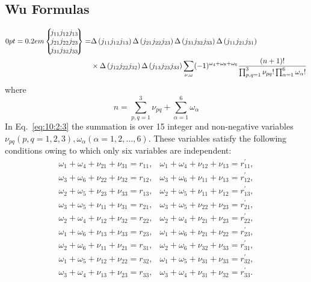 \subsection{Wu Formulas \cite{ref111}}\label{sec:10.2.2}
\begin{align}
\ninej{j_{11}}{j_{12}}{j_{13}}{j_{21}}{j_{22}}{j_{23}}{j_{31}}{j_{32}}{j_{33}}=&\Delta\left(j_{11} j_{12} j_{13}\right) \Delta\left(j_{21} j_{22} j_{23}\right) \Delta\left(j_{31} j_{32} j_{33}\right) \Delta\left(j_{11} j_{21} j_{31}\right)  \notag\\
& \times \Delta\left(j_{12} j_{22} j_{32}\right) \Delta\left(j_{13} j_{23} j_{33}\right) \sum_{\nu, \omega}(-1)^{\omega_{4}+\omega_{8}+\omega_{6}} \frac{(n+1)!}{\prod_{p, q=1}^{3} \nu_{p q}!\prod_{\alpha=1}^{6} \omega_{\alpha}!} \label{eq:10:2:2}
\end{align}
where
\begin{equation}
n=\sum_{p, q=1}^{3} \nu_{p q}+\sum_{\alpha=1}^{6} \omega_{\alpha} \label{eq:10:2:3}
\end{equation}
In Eq.~\eqref{eq:10:2:3} the summation is over 15 integer and non-negative variables $\nu_{p q}(p, q=1,2,3), \omega_{\alpha}(\alpha=1,2, \ldots, 6)$. These variables satisfy the following conditions owing to which only six variables are independent:
\begin{equation}
\begin{array}{ll}
\omega_{1}+\omega_{4}+\nu_{21}+\nu_{31}=r_{11}, & \omega_{1}+\omega_{4}+\nu_{12}+\nu_{13}=r_{11}^{\prime}, \\
\omega_{3}+\omega_{6}+\nu_{22}+\nu_{32}=r_{12}, & \omega_{3}+\omega_{6}+\nu_{11}+\nu_{13}=r_{12}^{\prime}, \\
\omega_{2}+\omega_{5}+\nu_{23}+\nu_{33}=r_{13}, & \omega_{2}+\omega_{5}+\nu_{11}+\nu_{12}=r_{13}^{\prime}, \\
\omega_{3}+\omega_{5}+\nu_{11}+\nu_{31}=r_{21}, & \omega_{3}+\omega_{5}+\nu_{22}+\nu_{23}=r_{21}^{\prime}, \\
\omega_{2}+\omega_{4}+\nu_{12}+\nu_{32}=r_{22}, & \omega_{2}+\omega_{4}+\nu_{21}+\nu_{23}=r_{22}^{\prime},  \label{eq:10:2:4}\\
\omega_{1}+\omega_{6}+\nu_{13}+\nu_{33}=r_{23}, & \omega_{1}+\omega_{6}+\nu_{21}+\nu_{22}=r_{23}^{\prime}, \\
\omega_{2}+\omega_{6}+\nu_{11}+\nu_{21}=r_{31}, & \omega_{2}+\omega_{6}+\nu_{32}+\nu_{33}=r_{31}^{\prime}, \\
\omega_{1}+\omega_{5}+\nu_{12}+\nu_{22}=r_{32}, & \omega_{1}+\omega_{5}+\nu_{31}+\nu_{33}=r_{32}^{\prime}, \\
\omega_{3}+\omega_{4}+\nu_{13}+\nu_{23}=r_{33}, & \omega_{3}+\omega_{4}+\nu_{31}+\nu_{32}=r_{33}^{\prime}.
\end{array}
\end{equation}
